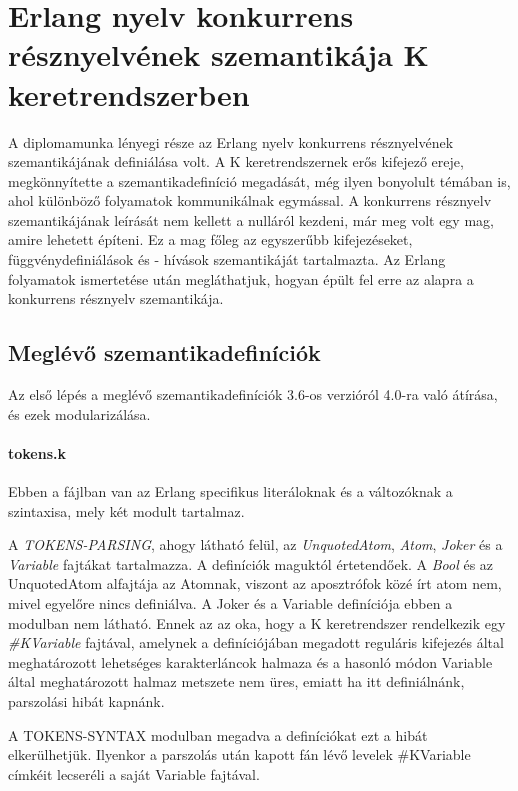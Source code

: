 \section{Erlang nyelv konkurrens résznyelvének szemantikája K keretrendszerben}
A diplomamunka lényegi része az Erlang nyelv konkurrens résznyelvének szemantikájának definiálása volt. A K keretrendszernek erős kifejező ereje, megkönnyítette a szemantikadefiníció megadását, még ilyen bonyolult témában is, ahol különböző folyamatok kommunikálnak egymással. A konkurrens résznyelv szemantikájának leírását nem kellett a nulláról kezdeni, már meg volt egy mag, amire lehetett építeni. Ez a mag főleg az egyszerűbb kifejezéseket, függvénydefiniálások és - hívások szemantikáját tartalmazta. Az Erlang folyamatok ismertetése után megláthatjuk, hogyan épült fel erre az alapra a konkurrens résznyelv szemantikája.

\subsection{Meglévő szemantikadefiníciók}
Az első lépés a meglévő szemantikadefiníciók 3.6-os verzióról 4.0-ra való átírása, és ezek modularizálása.

\paragraph{tokens.k}
Ebben a fájlban van az Erlang specifikus literáloknak és a változóknak a szintaxisa, mely két modult tartalmaz.



A \textit{TOKENS-PARSING}, ahogy látható felül, az \textit{UnquotedAtom}, \textit{Atom}, \textit{Joker} és a \textit{Variable} fajtákat tartalmazza. A definíciók maguktól értetendőek. A \textit{Bool} és az UnquotedAtom alfajtája az Atomnak, viszont az aposztrófok közé írt atom nem, mivel egyelőre nincs definiálva. A Joker és a Variable definíciója ebben a modulban nem látható. Ennek az az oka, hogy a K keretrendszer rendelkezik egy \textit{\#KVariable} fajtával, amelynek a definíciójában megadott reguláris kifejezés által meghatározott lehetséges karakterláncok halmaza és a hasonló módon Variable által meghatározott halmaz metszete nem üres, emiatt ha itt definiálnánk, parszolási hibát kapnánk.
\newline


A TOKENS-SYNTAX modulban megadva a definíciókat ezt a hibát elkerülhetjük. Ilyenkor a parszolás után kapott fán lévő levelek \#KVariable címkéit lecseréli a saját Variable fajtával.

